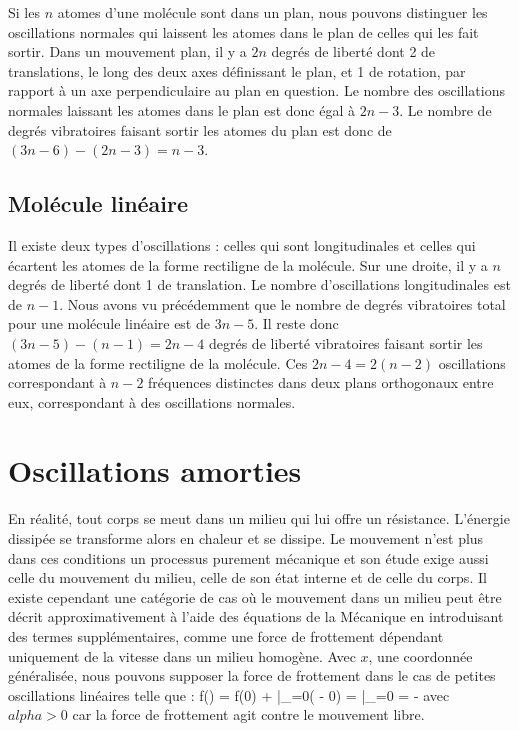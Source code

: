 Si les $n$ atomes d'une mol\'ecule sont dans un plan, nous pouvons distinguer les oscillations normales qui laissent les atomes dans le plan de celles qui les fait sortir. Dans un mouvement plan, il y a $2n$ degr\'es de libert\'e dont 2 de translations, le long des deux axes d\'efinissant le plan, et 1 de rotation, par rapport \`a un axe perpendiculaire au plan en question. Le nombre des oscillations normales laissant les atomes dans le plan est donc \'egal \`a $2n - 3$. Le nombre de degr\'es vibratoires faisant sortir les atomes du plan est donc de $(3n - 6) - (2n - 3) = n - 3$.

\subsection{Mol\'ecule lin\'eaire}

Il existe deux types d'oscillations : celles qui sont longitudinales et celles qui \'ecartent les atomes de la forme rectiligne de la mol\'ecule. Sur une droite, il y a $n$ degr\'es de libert\'e dont 1 de translation. Le nombre d'oscillations longitudinales est de $n - 1$. Nous avons vu pr\'ec\'edemment que le nombre de degr\'es vibratoires total pour une mol\'ecule lin\'eaire est de $3n - 5$. Il reste donc $(3n - 5) - (n - 1) = 2n - 4$ degr\'es de libert\'e vibratoires faisant sortir les atomes de la forme rectiligne de la mol\'ecule. Ces $2n - 4 = 2(n - 2)$ oscillations correspondant \`a $n - 2$ fr\'equences distinctes dans deux plans orthogonaux entre eux, correspondant \`a des oscillations normales.

\section{Oscillations amorties}\label{PAR:25}

En r\'{e}alit\'{e}, tout corps se meut dans un milieu qui lui offre un r\'{e}sistance. L'\'{e}nergie dissip\'{e}e se transforme alors en chaleur et se dissipe. Le mouvement n'est plus dans ces conditions un processus purement m\'{e}canique et son \'{e}tude exige aussi celle du mouvement du milieu, celle de son \'{e}tat interne et de celle du corps. Il existe cependant une cat\'{e}gorie de cas o\`{u} le mouvement dans un milieu peut \^{e}tre d\'{e}crit approximativement \`{a} l'aide des \'{e}quations de la M\'{e}canique en introduisant des termes suppl\'{e}mentaires, comme une force de frottement d\'{e}pendant uniquement de la vitesse dans un milieu homog\`{e}ne. Avec $x$, une coordonn\'{e}e g\'{e}n\'{e}ralis\'{e}e, nous pouvons supposer la force de frottement dans le cas de petites oscillations lin\'{e}aires telle que :
\benn
	f() = f(0) + \bigg|_{=0}( - 0) = \bigg|_{=0} = -\alpha{}
\eenn
avec $alpha > 0$ car la force de frottement agit contre le mouvement libre.

